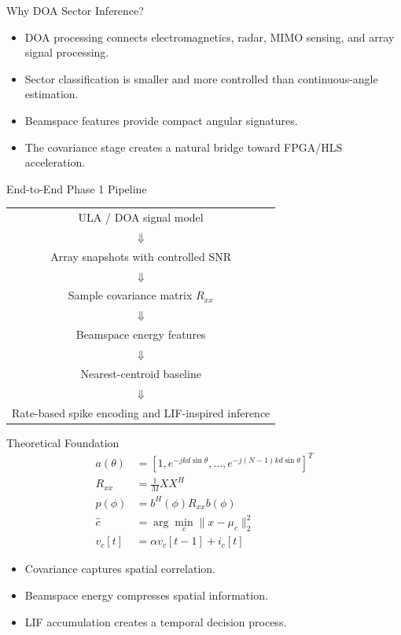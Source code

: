 \documentclass[aspectratio=169]{beamer}
\begin{document}
\begin{frame}{Why DOA Sector Inference?}
\begin{itemize}
    \item DOA processing connects electromagnetics, radar, MIMO sensing, and array signal processing.
    \item Sector classification is smaller and more controlled than continuous-angle estimation.
    \item Beamspace features provide compact angular signatures.
    \item The covariance stage creates a natural bridge toward FPGA/HLS acceleration.
\end{itemize}
\end{frame}

\begin{frame}{End-to-End Phase 1 Pipeline}
\centering
\begin{tabular}{c}
ULA / DOA signal model \\
$\Downarrow$ \\
Array snapshots with controlled SNR \\
$\Downarrow$ \\
Sample covariance matrix $R_{xx}$ \\
$\Downarrow$ \\
Beamspace energy features \\
$\Downarrow$ \\
Nearest-centroid baseline \\
$\Downarrow$ \\
Rate-based spike encoding and LIF-inspired inference
\end{tabular}
\end{frame}

\begin{frame}{Theoretical Foundation}
\small
\begin{align*}
    a(\theta) &= [1,e^{-jkd\sin\theta},\ldots,e^{-j(N-1)kd\sin\theta}]^{T} \\
    R_{xx} &= \frac{1}{M}XX^{H} \\
    p(\phi) &= b^{H}(\phi)R_{xx}b(\phi) \\
    \hat{c} &= \arg\min_c \lVert x-\mu_c\rVert_2^2 \\
    v_c[t] &= \alpha v_c[t-1]+i_c[t]
\end{align*}
\begin{itemize}
    \item Covariance captures spatial correlation.
    \item Beamspace energy compresses spatial information.
    \item LIF accumulation creates a temporal decision process.
\end{itemize}
\end{frame}
\end{document}
